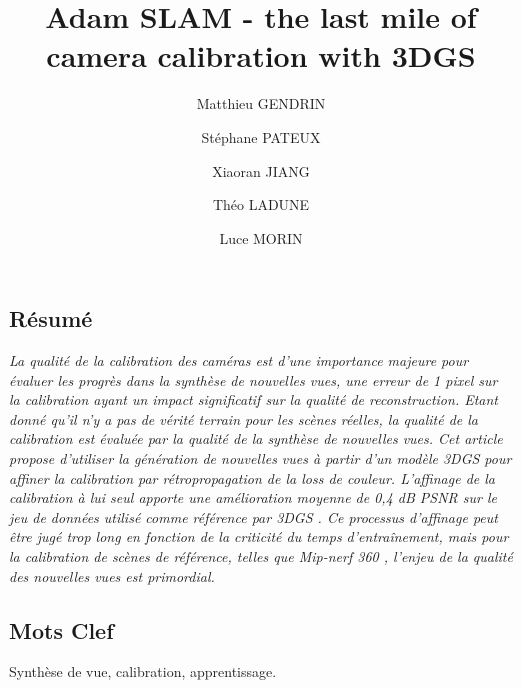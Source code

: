 \documentclass[a4paper,twoside,french]{article}
\begin{document}
\date{}
\title{\Large\bf Adam SLAM - the last mile of camera calibration with 3DGS}
\author[1,2]{Matthieu GENDRIN}
\author[1]{Stéphane PATEUX}
\author[2]{Xiaoran JIANG}
\author[1]{Théo LADUNE}
\author[2]{Luce MORIN}
\maketitle
\subsection*{Résumé}
{\em
La qualité de la calibration des caméras est d'une importance majeure pour évaluer les progrès dans la synthèse de nouvelles vues,
une erreur de 1 pixel sur la calibration ayant un impact significatif sur la qualité de reconstruction.
Etant donné qu'il n'y a pas de vérité terrain pour les scènes réelles, la qualité de la calibration est évaluée par la qualité de
la synthèse de nouvelles vues.
Cet article propose d'utiliser la génération de nouvelles vues à partir d'un modèle 3DGS \cite{kerbl20233d} pour affiner la
calibration par rétropropagation de la loss de couleur.
L'affinage de la calibration à lui seul apporte une amélioration moyenne de 0,4 dB PSNR sur le jeu de données utilisé comme référence
par 3DGS \cite{kerbl20233d}.
Ce processus d'affinage peut être jugé trop long en fonction de la criticité du temps d'entraînement, mais pour la calibration de
scènes de référence, telles que Mip-nerf 360 \cite{barron2022mip}, l'enjeu de la qualité des nouvelles vues est primordial.
}
\subsection*{Mots Clef}
Synthèse de vue, calibration, apprentissage.
\end{document}
